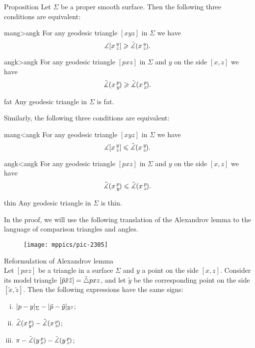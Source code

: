 \begin{thm}{Proposition}\label{prop:comp-reformulations}
Let $\Sigma$ be a proper smooth surface.
Then the following three conditions are equivalent:

\begin{subthm}{mang>angk}
For any geodesic triangle $[xyz]$ in $\Sigma$ we have
 \[\measuredangle[x\,{}^{y}_{z}]\geqslant\tilde\measuredangle(x\,{}^{y}_{z}\hspace{-0.2ex}).\]
\end{subthm}

\begin{subthm}{angk>angk} For any geodesic triangle $[pxz]$ in $\Sigma$ and $y$ on the side $[x,z]$ we have
 \[\tilde\measuredangle(x\,{}^{p}_{y}\hspace{-0.2ex}) \geqslant \tilde\measuredangle(x\,{}^{p}_{z}\hspace{-0.2ex}).\]
 
\end{subthm}

\begin{subthm}{fat}
 Any geodesic triangle in $\Sigma$ is fat.
\end{subthm}

\medskip

Similarly, the following three conditions are equivalent:

\begin{subthmA}{mang<angk}
For any geodesic triangle $[xyz]$ in $\Sigma$ we have
 \[\measuredangle[x\,{}^{y}_{z}]\leqslant\tilde\measuredangle(x\,{}^{y}_{z}\hspace{-0.2ex}).\]
\end{subthmA}

\begin{subthmA}{angk<angk} For any geodesic triangle $[pxz]$ in $\Sigma$ and $y$ on the side $[x,z]$ we have
 \[\tilde\measuredangle(x\,{}^{p}_{y}\hspace{-0.2ex}) \leqslant \tilde\measuredangle(x\,{}^{p}_{z}\hspace{-0.2ex}).\]
\end{subthmA}

\begin{subthmA}{thin}
Any geodesic triangle in $\Sigma$ is thin.
\end{subthmA}

\end{thm}

In the proof, we will use the following translation of the Alexandrov lemma to the language of comparison triangles and angles.

\begin{wrapfigure}{r}{25mm}
\vskip-0mm
\centering
\texttt{[image: mppics/pic-2305]}
\end{wrapfigure}

\begin{thm}{Reformulation of Alexandrov lemma}\label{lem:alex-reformulation}\\
Let $[pxz]$ be a triangle in a surface $\Sigma$
and $y$ a point on the side $[x,z]$.
Consider its model triangle $[\tilde p\tilde x\tilde z]\z=\tilde\triangle pxz$, and let $\tilde y$ be the corresponding point on the side $[\tilde x,\tilde z]$.
Then the following expressions have the same signs:
\begin{enumerate}[(i)]
 \item $\dist{p}{y}\Sigma-\dist{\tilde p}{\tilde y}{\mathbb{R}^2}$;
 \item $\tilde\measuredangle(x\,{}^{p}_{y}\hspace{-0.2ex})-\tilde\measuredangle(x\,{}^{p}_{z}\hspace{-0.2ex})$;
 \item $\pi-\tilde\measuredangle(y\,{}^{p}_{x}\hspace{-0.2ex})-\tilde\measuredangle(y\,{}^{p}_{z}\hspace{-0.2ex})$;
\end{enumerate}
\end{thm}

